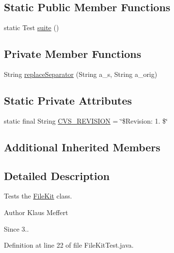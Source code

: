 \subsection*{Static Public Member Functions}
\begin{DoxyCompactItemize}
\item 
static Test \hyperlink{classorg_1_1jgap_1_1util_1_1_file_kit_test_a5f6991955f126a97a40257dd0994f34a}{suite} ()
\end{DoxyCompactItemize}
\subsection*{Private Member Functions}
\begin{DoxyCompactItemize}
\item 
String \hyperlink{classorg_1_1jgap_1_1util_1_1_file_kit_test_a2d7424ae56512e7911efc4aab639dcb7}{replace\-Separator} (String a\-\_\-s, String a\-\_\-orig)
\end{DoxyCompactItemize}
\subsection*{Static Private Attributes}
\begin{DoxyCompactItemize}
\item 
static final String \hyperlink{classorg_1_1jgap_1_1util_1_1_file_kit_test_ae77f68255c346d2573235c4a6e9ecf90}{C\-V\-S\-\_\-\-R\-E\-V\-I\-S\-I\-O\-N} = \char`\"{}\$Revision\-: 1. \$\char`\"{}
\end{DoxyCompactItemize}
\subsection*{Additional Inherited Members}


\subsection{Detailed Description}
Tests the \hyperlink{classorg_1_1jgap_1_1util_1_1_file_kit}{File\-Kit} class.

\begin{DoxyAuthor}{Author}
Klaus Meffert 
\end{DoxyAuthor}
\begin{DoxySince}{Since}
3.. 
\end{DoxySince}


Definition at line 22 of file File\-Kit\-Test.\-java.



